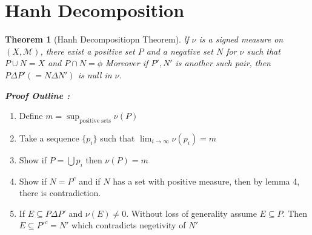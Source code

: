 \documentclass{tufte-book}
\newtheorem{theorem}{Theorem}
\begin{document}
\section{Hanh Decomposition}

\begin{theorem}[Hanh Decompositiopn Theorem]
	lf $\nu$ is a signed measure on $(X,\mathcal M)$, there 
	exist a positive set $P$ and a negative set $N$ for $\nu$ such that $P\cup N = X$ and $P\cap N =\phi$ 
	Moreover if  $P', N'$ is another such pair, then $P\Delta P' (= N \Delta N')$ is null in $\nu$.
\end{theorem}
\noindent\textbf{\textit{Proof Outline :}}
\begin{enumerate}
	\item Define $m=\sup_{\text{positive sets}}\nu(P)$
	\item Take a sequence $\{p_i\}$ such that $\lim_{i\to\infty}\nu(p_i)=m$
	\item Show if $P=\bigcup p_i$ then $\nu(P)=m$
	\item Show if $N=P^c$ and if $N$ has a set with positive measure, then by lemma 4, there is contradiction.
	\item If $E\subseteq P\Delta P'$ and $\nu(E)\ne0$. Without loss of generality assume $E\subseteq P$. Then $E\subseteq P'^c=N'$ which contradicts negetivity of $N'$ 
\end{enumerate}



\backmatter





\printindex
\end{document}
